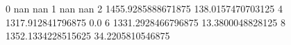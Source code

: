0 nan nan
1 nan nan
2 1455.9285888671875 138.0157470703125
4 1317.912841796875 0.0
6 1331.2928466796875 13.3800048828125
8 1352.1334228515625 34.2205810546875
